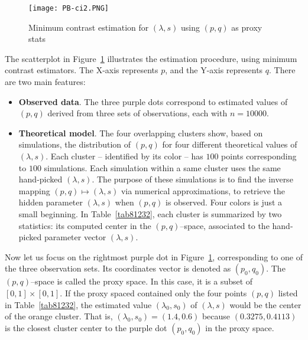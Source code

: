 \documentclass[oneside,10pt]{book}
\begin{document}
\begin{figure}[H]
\centering
\texttt{[image: PB-ci2.PNG]}  %
\caption{Minimum contrast estimation for $(\lambda,s)$ using $(p,q)$ as proxy stats}
\label{fig:pbcixzas}
\end{figure}

\noindent The scatterplot in Figure~\ref{fig:pbcixzas} illustrates the estimation procedure, using minimum contrast estimators. The X-axis represents $p$, and the Y-axis represents $q$. There are two main features: \vspace{1ex}
\begin{itemize}
\item {\bf Observed data}. The three purple dots correspond to estimated values of $(p,q)$ derived from three  sets of observations,  each with $n=\num{10000}$.

\item {\bf Theoretical model}. The four overlapping clusters show, based on simulations, the distribution of $(p,q)$ for four different theoretical values
of $(\lambda,s)$. Each cluster -- identified by its color -- has $100$ points corresponding to $100$ simulations. Each simulation within a same cluster uses
the same hand-picked $(\lambda,s)$.  The purpose of these simulations is to find the inverse mapping $(p, q) \mapsto (\lambda,s)$
via numerical approximations, to retrieve the hidden parameter $(\lambda,s)$ when $(p,q)$ is observed. Four colors is just a small beginning. In  Table~\ref{tab81232}, each cluster is summarized by two statistics: its computed center in the $(p,q)$--space, associated to the hand-picked parameter vector $(\lambda,s)$.
\end{itemize}\vspace{1ex}


\noindent Now let us focus on the rightmost purple dot in Figure~\ref{fig:pbcixzas}, corresponding to one of the three observation sets. Its coordinates vector
 is denoted as $(p_0,q_0)$.
The $(p,q)$--space is called the \textcolor{index}{proxy space}. In this case, it is a subset of $[0,1]\times [0,1]$. If
the proxy spaced contained only the four points $(p,q)$ listed in Table~\ref{tab81232}, the estimated value $(\lambda_0,s_0)$ of $(\lambda,s)$ would be the center of the orange cluster.  That is, $(\lambda_0,s_0)=(1.4, 0.6)$ because $(0.3275,0.4113)$  is the closest cluster center to the purple dot $(p_0,q_0)$ in the proxy space.
\end{document}
